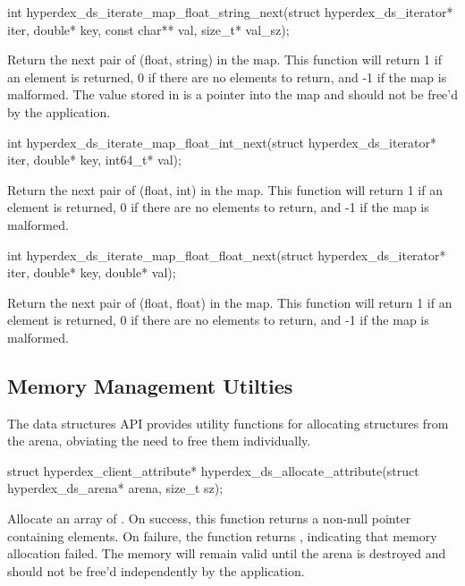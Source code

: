 \funcsep
\begin{ccode}
int hyperdex_ds_iterate_map_float_string_next(struct hyperdex_ds_iterator* iter,
                                              double* key,
                                              const char** val, size_t* val_sz);
\end{ccode}
\funcdesc Return the next pair of (float, string) in the map.  This function
will return 1 if an element is returned, 0 if there are no elements to return,
and -1 if the map is malformed.  The value stored in  is a pointer
into the map and should not be free'd by the application.

\funcsep
\begin{ccode}
int hyperdex_ds_iterate_map_float_int_next(struct hyperdex_ds_iterator* iter,
                                           double* key, int64_t* val);
\end{ccode}
\funcdesc Return the next pair of (float, int) in the map.  This function will
return 1 if an element is returned, 0 if there are no elements to return, and -1
if the map is malformed.

\funcsep
\begin{ccode}
int hyperdex_ds_iterate_map_float_float_next(struct hyperdex_ds_iterator* iter,
                                             double* key, double* val);
\end{ccode}
\funcdesc Return the next pair of (float, float) in the map.  This function will
return 1 if an element is returned, 0 if there are no elements to return, and -1
if the map is malformed.

\subsection{Memory Management Utilties}

The data structures API provides utility functions for allocating structures
from the arena, obviating the need to free them individually.

\funcsep
\begin{ccode}
struct hyperdex_client_attribute*
hyperdex_ds_allocate_attribute(struct hyperdex_ds_arena* arena, size_t sz);
\end{ccode}
\funcdesc Allocate an array of .  On
success, this function returns a non-null pointer containing  elements.
On failure, the function returns , indicating that memory allocation
failed.  The memory will remain valid until the arena is destroyed and should
not be free'd independently by the application.

